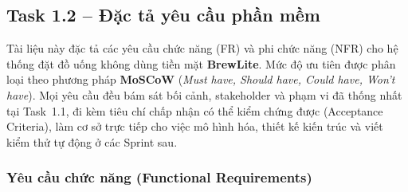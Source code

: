 
\subsection{Task 1.2 -- Đặc tả yêu cầu phần mềm}

Tài liệu này đặc tả các yêu cầu chức năng (FR) và phi chức năng (NFR) cho hệ thống đặt đồ uống không dùng tiền mặt \textbf{BrewLite}.
Mức độ ưu tiên được phân loại theo phương pháp \textbf{MoSCoW} (\emph{Must have, Should have, Could have, Won't have}).
Mọi yêu cầu đều bám sát bối cảnh, stakeholder và phạm vi đã thống nhất tại Task~1.1, đi kèm tiêu chí chấp nhận có thể kiểm chứng được (Acceptance Criteria), làm cơ sở trực tiếp cho việc mô hình hóa, thiết kế kiến trúc và viết kiểm thử tự động ở các Sprint sau.

\subsubsection{Yêu cầu chức năng (Functional Requirements)}

